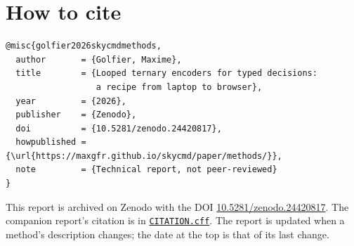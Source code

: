 \documentclass[10pt]{article}
\begin{document}
\section*{How to cite}

\begin{Verbatim}[fontsize=\small]
@misc{golfier2026skycmdmethods,
  author       = {Golfier, Maxime},
  title        = {Looped ternary encoders for typed decisions:
                  a recipe from laptop to browser},
  year         = {2026},
  publisher    = {Zenodo},
  doi          = {10.5281/zenodo.24420817},
  howpublished = {\url{https://maxgfr.github.io/skycmd/paper/methods/}},
  note         = {Technical report, not peer-reviewed}
}
\end{Verbatim}

\noindent This report is archived on Zenodo with the DOI \href{https://doi.org/10.5281/zenodo.24420817}{10.5281/zenodo.24420817}. The companion report's citation is in \href{https://github.com/maxgfr/skycmd/blob/main/CITATION.cff}{\texttt{CITATION.cff}}. The report is updated when a method's description changes; the date at the top is that of its last change.
\end{document}
